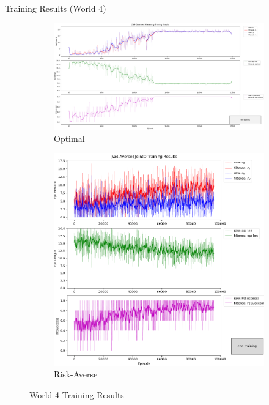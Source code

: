 \documentclass[aspectratio=1610, xcolor=dvipsnames]{packages/beamer}
\begin{document}
\begin{frame}{Training Results (World 4)}
     \begin{figure}
     \centering
          \begin{subfigure}[b]{\Wfig\textwidth}  \centering
              \includegraphics[width=\textwidth]{../results/IDQN_W4/Fig_W4_JointQ_Baseline.png}
              \caption{Optimal} \label{fig:W4baseline}
          \end{subfigure}
          \hfill
         \begin{subfigure}[b]{\Wfig\textwidth} \centering
             \includegraphics[width=\textwidth]{../results/IDQN_W4/Fig_W4_JointQ_Averse}
             \caption{Risk-Averse} \label{fig:W4averse}
         \end{subfigure}
    \caption{World 4 Training Results}
    \label{fig:W4}
    \end{figure}
\end{frame}
\end{document}

